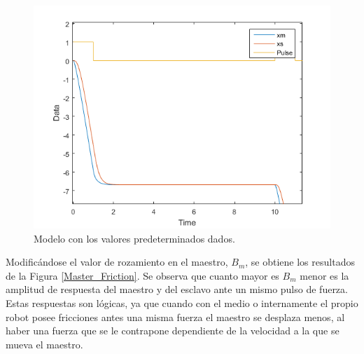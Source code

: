 \documentclass[a4paper, fontsize=11pt]{scrartcl} %
\numberwithin{equation}{section} %
\numberwithin{figure}{section} %
\numberwithin{table}{section} %
\begin{document}
	\begin{figure}[h]
		\centering
		\includegraphics[width=0.5\linewidth]{images/Predet.PNG}
		\caption{Modelo con los valores predeterminados dados.}
		\label{Predet Values}
	\end{figure}
	\FloatBarrier

	Modificándose el valor de rozamiento en el maestro, $B_m$, se obtiene los resultados de la Figura \ref{Master_Friction}. Se observa que cuanto mayor es $B_m$ menor es la amplitud de respuesta del maestro y del esclavo ante un mismo pulso de fuerza. Estas respuestas son lógicas, ya que cuando con el medio o internamente el propio robot posee fricciones antes una misma fuerza el maestro se desplaza menos, al haber una fuerza que se le contrapone dependiente de la velocidad a la que se mueva el maestro.\\
	
\end{document}
